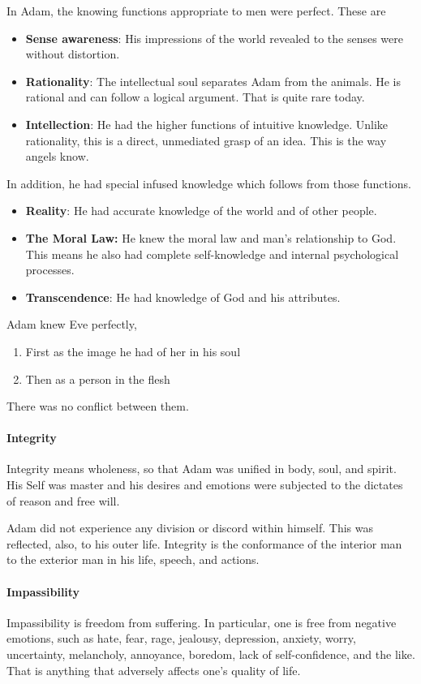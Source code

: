In Adam, the knowing functions appropriate to men were perfect. These are

\begin{itemize}
\item \textbf{Sense awareness}: His impressions of the world revealed to the senses were without distortion. 
\item \textbf{Rationality}: The intellectual soul separates Adam from the animals. He is rational and can follow a logical argument. That is quite rare today. 
\item \textbf{Intellection}: He had the higher functions of intuitive knowledge. Unlike rationality, this is a direct, unmediated grasp of an idea. This is the way angels know. 
\end{itemize}
In addition, he had special infused knowledge which follows from those functions.

\begin{itemize}
\item \textbf{Reality}: He had accurate knowledge of the world and of other people. 
\item \textbf{The Moral Law:} He knew the moral law and man's relationship to God. This means he also had complete self-knowledge and internal psychological processes. 
\item \textbf{Transcendence}: He had knowledge of God and his attributes. 
\end{itemize}
Adam knew Eve perfectly,

\begin{enumerate}
\item First as the image he had of her in his soul 
\item Then as a person in the flesh 
\end{enumerate}
There was no conflict between them.

\paragraph{Integrity}
Integrity means wholeness, so that Adam was unified in body, soul, and spirit. His Self was master and his desires and emotions were subjected to the dictates of reason and free will.

Adam did not experience any division or discord within himself. This was reflected, also, to his outer life. Integrity is the conformance of the interior man to the exterior man in his life, speech, and actions.

\paragraph{Impassibility}
Impassibility is freedom from suffering. In particular, one is free from negative emotions, such as hate, fear, rage, jealousy, depression, anxiety, worry, uncertainty, melancholy, annoyance, boredom, lack of self-confidence, and the like. That is anything that adversely affects one's quality of life.

